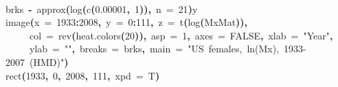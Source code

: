 \documentclass[a4paper]{article}
\newcommand{\hlnumber}[1]{\textcolor[rgb]{0.0823529411764706,0.0784313725490196,0.709803921568627}{#1}}%
\newcommand{\hlfunctioncall}[1]{\textcolor[rgb]{1,0,0}{#1}}%
\newcommand{\hlstring}[1]{\textcolor[rgb]{0.6,0.6,1}{#1}}%
\newcommand{\hlkeyword}[1]{\textcolor[rgb]{0,0,0}{\textbf{#1}}}%
\newcommand{\hlargument}[1]{\textcolor[rgb]{0.694117647058824,0.247058823529412,0.0196078431372549}{#1}}%
\newcommand{\hlassignement}[1]{\textcolor[rgb]{0.215686274509804,0.215686274509804,0.384313725490196}{\textbf{#1}}}%
\newcommand{\hlsymbol}[1]{\textcolor[rgb]{0,0,0}{#1}}%
\newcommand{\hlprompt}[1]{\textcolor[rgb]{0,0,0}{#1}}%
\newcommand{\hlstd}[1]{\textcolor[rgb]{0,0,0}{#1}}%
\newenvironment{Houtput}{\raggedright}{%
%
}
\begin{document}
\begin{Houtput}
\hspace*{\fill}\\
\hlstd{}\ttfamily\noindent
\hlprompt{\usebox{\hlnormalsizeboxgreaterthan}{\ }}\hlsymbol{brks}{\ }\hlassignement{\usebox{\hlnormalsizeboxlessthan}-}{\ }\hlfunctioncall{approx}\hlkeyword{(}\hlfunctioncall{log}\hlkeyword{(}\hlfunctioncall{c}\hlkeyword{(}\hlnumber{0.00001}\hlkeyword{,}{\ }\hlnumber{1}\hlkeyword{)}\hlkeyword{)}\hlkeyword{,}{\ }\hlargument{n}{\ }\hlargument{=}{\ }\hlnumber{21}\hlkeyword{)}\hlkeyword{\usebox{\hlnormalsizeboxdollar}}\hlsymbol{y}\mbox{}
\normalfont
\hspace*{\fill}\\
\hlstd{}\ttfamily\noindent
\hlprompt{\usebox{\hlnormalsizeboxgreaterthan}{\ }}\hlfunctioncall{image}\hlkeyword{(}\hlargument{x}{\ }\hlargument{=}{\ }\hlnumber{1933}\hlkeyword{:}\hlnumber{2008}\hlkeyword{,}{\ }\hlargument{y}{\ }\hlargument{=}{\ }\hlnumber{0}\hlkeyword{:}\hlnumber{111}\hlkeyword{,}{\ }\hlargument{z}{\ }\hlargument{=}{\ }\hlfunctioncall{t}\hlkeyword{(}\hlfunctioncall{log}\hlkeyword{(}\hlsymbol{MxMat}\hlkeyword{)}\hlkeyword{)}\hlkeyword{,}\hspace*{\fill}\\
\hlstd{}\hlprompt{{\ }}{\ }{\ }{\ }{\ }\hlargument{col}{\ }\hlargument{=}{\ }\hlfunctioncall{rev}\hlkeyword{(}\hlfunctioncall{heat.colors}\hlkeyword{(}\hlnumber{20}\hlkeyword{)}\hlkeyword{)}\hlkeyword{,}{\ }\hlargument{asp}{\ }\hlargument{=}{\ }\hlnumber{1}\hlkeyword{,}{\ }\hlargument{axes}{\ }\hlargument{=}{\ }\hlnumber{FALSE}\hlkeyword{,}{\ }\hlargument{xlab}{\ }\hlargument{=}{\ }\hlstring{"Year"}\hlkeyword{,}\hspace*{\fill}\\
\hlstd{}\hlprompt{{\ }}{\ }{\ }{\ }{\ }\hlargument{ylab}{\ }\hlargument{=}{\ }\hlstring{""}\hlkeyword{,}{\ }\hlargument{breaks}{\ }\hlargument{=}{\ }\hlsymbol{brks}\hlkeyword{,}{\ }\hlargument{main}{\ }\hlargument{=}{\ }\hlstring{"US{\ }females,{\ }ln(Mx),{\ }1933-2007{\ }(HMD)"}\hlkeyword{)}\mbox{}
\normalfont
\hspace*{\fill}\\
\hlstd{}\ttfamily\noindent
\hlprompt{\usebox{\hlnormalsizeboxgreaterthan}{\ }}\hlfunctioncall{rect}\hlkeyword{(}\hlnumber{1933}\hlkeyword{,}{\ }\hlnumber{0}\hlkeyword{,}{\ }\hlnumber{2008}\hlkeyword{,}{\ }\hlnumber{111}\hlkeyword{,}{\ }\hlargument{xpd}{\ }\hlargument{=}{\ }\hlsymbol{T}\hlkeyword{)}\mbox{}
\normalfont
\hspace*{\fill}\\

\end{Houtput}
\end{document}
